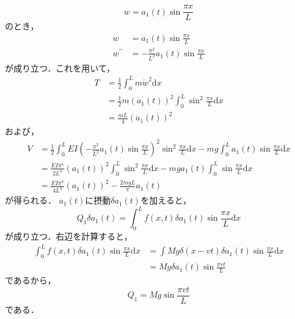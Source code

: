 \documentclass[a4paper]{jsarticle}
\begin{document}
\section{}
\subsection{}
\subsubsection{}
\begin{equation}
  w = a_1(t) \sin \frac{\pi x}{L}
\end{equation}
のとき，
\begin{align}
  \dot{w}          & = \dot{a}_1(t) \sin \frac{\pi x}{L}              \\
  w^{\prime\prime} & = -\frac{\pi^2}{L^2} a_1(t) \sin \frac{\pi x}{L}
\end{align}
が成り立つ．これを用いて，
\begin{equation}
  \begin{aligned}
    T & = \frac{1}{2} \int_0^L m \dot{w}^2 \mathrm{d} x \\
      & = \frac{1}{2} m \left(\dot{a}_1 (t)\right)^2
    \int_0^L \sin^2 \frac{\pi x}{L} \mathrm{d} x        \\
      & = \frac{m L}{4} \left(\dot{a}_1 (t)\right)^2
  \end{aligned}
\end{equation}
および，
\begin{equation}
  \begin{aligned}
    V & = \frac{1}{2} \int_0^L
    E I \left(-\frac{\pi^2}{L^2} a_1(t) \sin \frac{\pi x}{L}\right)^2
    \sin^2 \frac{\pi x}{L} \mathrm{d} x
    - m g \int_0^L a_1(t) \sin \frac{\pi x}{L} \mathrm{d} x \\
      & = \frac{E I \pi^4}{2 L^4}
    \left(a_1(t)\right)^2 \int_0^L \sin^2 \frac{\pi x}{L} \mathrm{d} x
    - m g a_1(t) \int_0^L \sin \frac{\pi x}{L} \mathrm{d} x \\
      & = \frac{E I \pi^4}{4 L^3} \left(a_1(t)\right)^2
    - \frac{2 m g L}{\pi} a_1(t)
  \end{aligned}
\end{equation}
が得られる．
$a_1(t)$に摂動$\delta a_1(t)$を加えると，
\begin{equation}
  Q_1 \delta a_1(t) =
  \int_0^L f(x, t) \delta a_1(t) \sin \frac{\pi x}{L} \mathrm{d} x
\end{equation}
が成り立つ．右辺を計算すると，
\begin{equation}
  \begin{aligned}
    \int_0^L f(x, t) \delta a_1(t) \sin \frac{\pi x}{L} \mathrm{d} x
     & = \int M g \delta (x - vt) \delta a_1(t) \sin \frac{\pi x}{L} \mathrm{d} x \\
     & = M g \delta a_1(t) \sin \frac{\pi v t}{L}
  \end{aligned}
\end{equation}
であるから，
\begin{equation}
  Q_1 = M g \sin \frac{\pi v t}{L}
\end{equation}
である．
\end{document}
